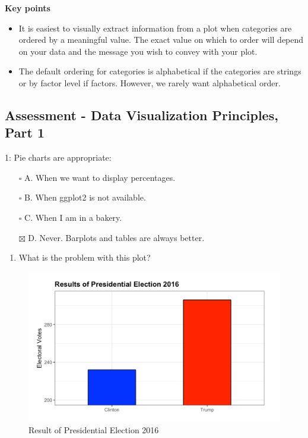 \documentclass[
]{article}
\providecommand{\tightlist}{%
  \setlength{\itemsep}{0pt}\setlength{\parskip}{0pt}}
\begin{document}
\textbf{Key points}

\begin{itemize}
\tightlist
\item
  It is easiest to visually extract information from a plot when
  categories are ordered by a meaningful value. The exact value on which
  to order will depend on your data and the message you wish to convey
  with your plot.
\item
  The default ordering for categories is alphabetical if the categories
  are strings or by factor level if factors. However, we rarely want
  alphabetical order.
\end{itemize}

\hypertarget{assessment---data-visualization-principles-part-1}{%
\subsection{Assessment - Data Visualization Principles, Part
1}\label{assessment---data-visualization-principles-part-1}}

1: Pie charts are appropriate:

\begin{itemize}
\tightlist
\item[$\square$]
  A. When we want to display percentages.
\item[$\square$]
  B. When ggplot2 is not available.
\item[$\square$]
  C. When I am in a bakery.
\item[$\boxtimes$]
  D. Never. Barplots and tables are always better.
\end{itemize}

\begin{enumerate}
\def\labelenumi{\arabic{enumi}.}
\setcounter{enumi}{1}
\tightlist
\item
  What is the problem with this plot?
\end{enumerate}

\begin{figure}
\centering
\includegraphics{images/Results of Presidential Election.png}
\caption{Result of Presidential Election 2016}
\end{figure}
\end{document}
